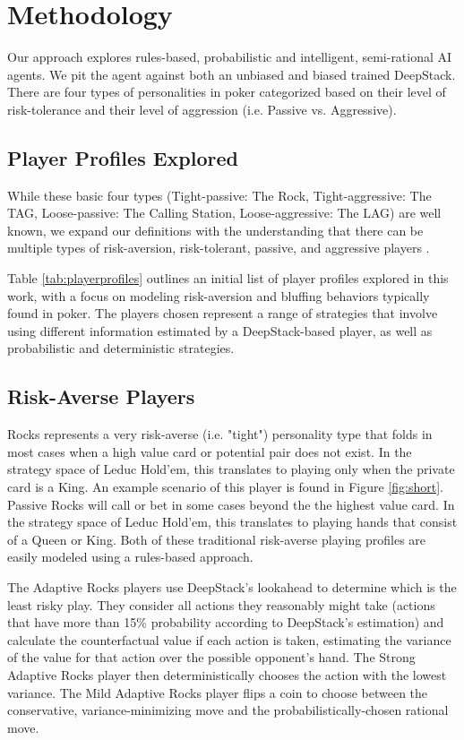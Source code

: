 \documentclass{article}
\begin{document}
\section{Methodology}
Our approach explores rules-based, probabilistic and intelligent, semi-rational AI agents. We pit the agent against both an unbiased and biased trained DeepStack. There are four types of personalities in poker categorized based on their level of risk-tolerance and their level of aggression (i.e. Passive vs. Aggressive).

\subsection{Player Profiles Explored}

\indent While these basic four types (Tight-passive: The Rock, Tight-aggressive: The TAG, Loose-passive: The Calling Station, Loose-aggressive: The LAG) are well known, we expand our definitions with the understanding that there can be multiple types of risk-aversion, risk-tolerant, passive, and aggressive players \cite{teafilo2013}.

\indent Table \ref{tab:playerprofiles} outlines an initial list of player profiles explored in this work, with a focus on modeling risk-aversion and bluffing behaviors typically found in poker.  The players chosen represent a range of strategies that involve using different information estimated by a DeepStack-based player, as well as probabilistic and deterministic strategies.

\subsection{Risk-Averse Players}
Rocks represents a very risk-averse (i.e. "tight") personality type that folds in most cases when a high value card or potential pair does not exist. In the strategy space of Leduc Hold'em, this translates to playing only when the private card is a King. An example scenario of this player is found in Figure \ref{fig:short}. Passive Rocks will call or bet in some cases beyond the the highest value card. In the strategy space of Leduc Hold'em, this translates to playing hands that consist of a Queen or King. Both of these traditional risk-averse playing profiles are easily modeled using a rules-based approach.

\indent The Adaptive Rocks players use DeepStack's lookahead to determine which is the least risky play. They consider all actions they reasonably might take (actions that have more than 15\% probability according to DeepStack's estimation) and calculate the counterfactual value if each action is taken, estimating the variance of the value for that action over the possible opponent's hand. The Strong Adaptive Rocks player then deterministically chooses the action with the lowest variance. The Mild Adaptive Rocks player flips a coin to choose between the conservative, variance-minimizing move and the probabilistically-chosen rational move.
\end{document}
